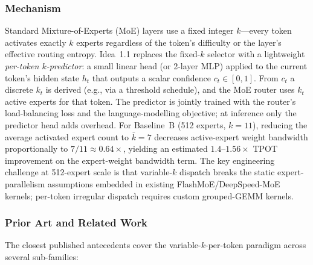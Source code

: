 \documentclass[11pt]{article}
\begin{document}
\subsubsection*{Mechanism}
Standard Mixture-of-Experts (MoE) layers use a fixed integer $k$---every token activates exactly $k$ experts regardless of the token's difficulty or the layer's effective routing entropy.
Idea~1.1 replaces the fixed-$k$ selector with a lightweight \emph{per-token $k$-predictor}: a small linear head (or 2-layer MLP) applied to the current token's hidden state $h_t$ that outputs a scalar confidence $c_t \in [0,1]$.
From $c_t$ a discrete $k_t$ is derived (e.g., via a threshold schedule), and the MoE router uses $k_t$ active experts for that token.
The predictor is jointly trained with the router's load-balancing loss and the language-modelling objective; at inference only the predictor head adds overhead.
For Baseline~B (512 experts, $k=11$), reducing the average activated expert count to $\bar{k}=7$ decreases active-expert weight bandwidth proportionally to $7/11 \approx 0.64\times$, yielding an estimated $1.4$--$1.56\times$ TPOT improvement on the expert-weight bandwidth term.
The key engineering challenge at 512-expert scale is that variable-$k$ dispatch breaks the static expert-parallelism assumptions embedded in existing FlashMoE/DeepSpeed-MoE kernels; per-token irregular dispatch requires custom grouped-GEMM kernels.

\subsubsection*{Prior Art and Related Work}
The closest published antecedents cover the variable-$k$-per-token paradigm across several sub-families:
\end{document}
